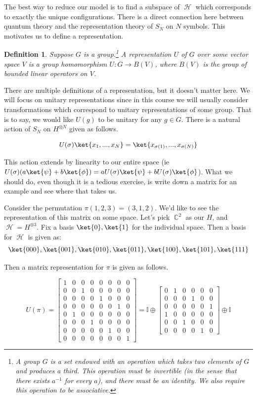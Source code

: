 \documentclass{article}
\DeclareMathOperator{\Hh}{{\mathcal{H}}}
\DeclareMathOperator{\CC}{\mathbb{C}}
\newtheorem{defn}{Definition}
\begin{document}
The best way to reduce our model is to find a subspace of $\Hh$ which corresponds to exactly the unique configurations. There is a direct connection here between quantum theory and the representation theory of $S_N$ on $N$ symbols. This motivates us to define a representation.

\begin{defn}
Suppose $G$ is a group.\footnote{A group $G$ is a set endowed with an operation which takes two elements of $G$ and produces a third. This operation must be invertible (in the sense that there exists $a^{-1}$ for every $a$), and there must be an identity. We also require this operation to be associative.} A representation $U$ of $G$ over some vector space $V$ is a group homomorphism $U:G \to B(V)$, where $B(V)$ is the group of bounded linear operators on $V$.
\end{defn}

There are multiple definitions of a representation, but it doesn't matter here. We will focus on unitary representations since in this course we will usually consider transformations which correspond to unitary representations of some group. That is to say, we would like $U(g)$ to be unitary for any $g \in G$. There is a natural action of $S_N$ on $H^{\otimes N}$ given as follows.

\begin{equation}
U(\sigma)\ket{x_1,...,x_N} = \ket{x_{\sigma(1)},...,x_{\sigma(N)}}
\end{equation}

This action extends by linearity to our entire space (ie $U(\sigma)(a\ket{\psi}+b\ket{\phi}) = aU(\sigma)\ket{\psi}+bU(\sigma)\ket{\phi}$). What we should do, even though it is a tedious exercise, is write down a matrix for an example and see where that takes us.

Consider the permutation $\pi(1,2,3)=(3,1,2)$. We'd like to see the representation of this matrix on some space. Let's pick $\CC^2$ as our $H$, and $\Hh=H^{\otimes 3}$. Fix a basis $\ket{0},\ket{1}$ for the individual space. Then a basis for $\Hh$ is given as:
\[\ket{000},\ket{001},\ket{010},\ket{011},\ket{100},\ket{101},\ket{111}\]

Then a matrix representation for $\pi$ is given as follows.

\[U(\pi) =  \begin{bmatrix}
1&0&0&0&0&0&0&0\\
0&0&1&0&0&0&0&0\\
0&0&0&0&1&0&0&0\\
0&0&0&0&0&0&1&0\\
0&1&0&0&0&0&0&0\\
0&0&0&1&0&0&0&0\\
0&0&0&0&0&1&0&0\\
0&0&0&0&0&0&0&1
		\end{bmatrix}= \mathbb{I}\oplus
\begin{bmatrix}
0&1&0&0&0&0\\
0&0&0&1&0&0\\
0&0&0&0&0&1\\
1&0&0&0&0&0\\
0&0&1&0&0&0\\
0&0&0&0&1&0
\end{bmatrix}\oplus\mathbb{I}\]
\end{document}
